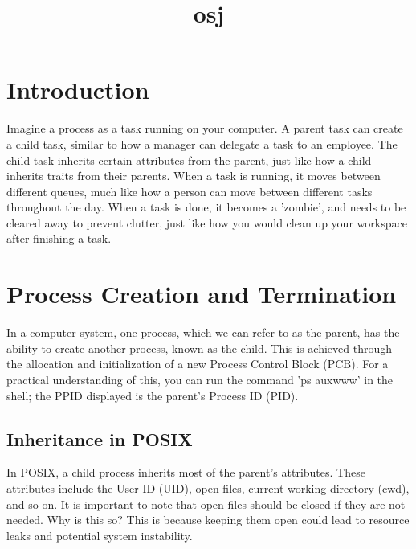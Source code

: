 \documentclass[12pt]{report}
\title{osj}
\author{}
\begin{document}
\maketitle
\tableofcontents
\newpage

\section{Introduction}
\begin{tcolorbox}[
colback=blue!10,
colframe=blue,
title={\fontfamily{lmr}\selectfont \\faComment\ Simplified Explanation},
fonttitle=\bfseries,
fontupper=\fontfamily{lmr}\selectfont,
boxrule=1pt,
sharp corners,
]
Imagine a process as a task running on your computer. A parent task can create a child task, similar to how a manager can delegate a task to an employee. The child task inherits certain attributes from the parent, just like how a child inherits traits from their parents. When a task is running, it moves between different queues, much like how a person can move between different tasks throughout the day. When a task is done, it becomes a 'zombie', and needs to be cleared away to prevent clutter, just like how you would clean up your workspace after finishing a task.
\end{tcolorbox}
\section{Process Creation and Termination}

In a computer system, one process, which we can refer to as the parent, has the ability to create another process, known as the child. This is achieved through the allocation and initialization of a new Process Control Block (PCB). For a practical understanding of this, you can run the command 'ps auxwww' in the shell; the PPID displayed is the parent's Process ID (PID).

\subsection{Inheritance in POSIX}

In POSIX, a child process inherits most of the parent's attributes. These attributes include the User ID (UID), open files, current working directory (cwd), and so on. It is important to note that open files should be closed if they are not needed. Why is this so? This is because keeping them open could lead to resource leaks and potential system instability.
\end{document}
